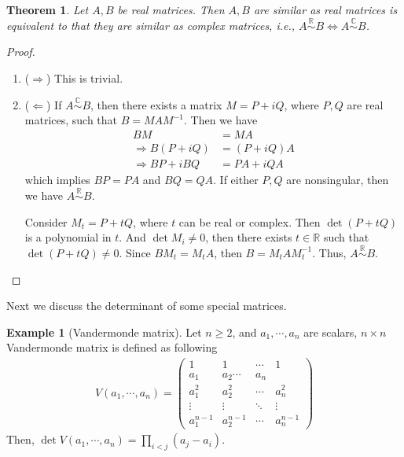\documentclass[11pt]{book}
\newtheorem{theorem}{Theorem}[section]
\theoremstyle{definition}
\newtheorem{example}{Example}[section]
\numberwithin{equation}{chapter}
\begin{document}
\medskip

\begin{theorem}
Let $A,B$ be real matrices. Then $A,B$ are similar as real matrices is equivalent to that they are similar as complex matrices, i.e., $A \overset{\mathbb{R}}{\sim} B\iff A \overset{\mathbb{C}}{\sim} B$.
\end{theorem}
\begin{proof}
~\begin{enumerate}[label=(\arabic*)]
    \item ($\Rightarrow$) This is trivial.
    \item ($\Leftarrow$) If $A \overset{\mathbb{C}}{\sim} B$, then there exists a matrix $M = P + iQ$, where $P,Q$ are real matrices, such that $B = MAM^{-1}$. Then we have
    \begin{align*}
        BM & = MA \\
        \Rightarrow B(P + iQ) & = (P + iQ)A \\
        \Rightarrow BP + i BQ & = PA + i QA
    \end{align*}
    which implies $BP=PA$ and $BQ = QA$. If either $P,Q$ are nonsingular, then we have $A \overset{\mathbb{R}}{\sim} B$.
    
    Consider $M_t = P + tQ$, where $t$ can be real or complex. Then $\det (P+tQ)$ is a polynomial in $t$. And $\det M_i \neq 0$, then there exists $t\in\mathbb{R}$ such that $\det (P+tQ)\neq 0$. Since $BM_t = M_t A$, then $B = M_t A M_t^{-1}$. Thus, $A \overset{\mathbb{R}}{\sim} B$.
\end{enumerate}
\end{proof}

\medskip

Next we discuss the determinant of some special matrices.

\begin{example}[Vandermonde matrix]
Let $n\geq 2$, and $a_1, \cdots, a_n$ are scalars, $n\times n$ Vandermonde matrix is defined as following
\begin{align*}
    V(a_1,\cdots,a_n) = \left(\begin{matrix}
        1 & 1 & \cdots & 1\\
        a_1 & a_2 \cdots & a_n \\
        a_1^2 & a_2^2 & \cdots & a_n^2 \\
        \vdots & \vdots & \ddots & \vdots \\
        a_1^{n-1} & a_2^{n-1} & \cdots & a_n^{n-1}
    \end{matrix}\right)
\end{align*}
Then, $\det V(a_1,\cdots,a_n) = \prod_{i < j}(a_j - a_i)$.
\end{example}
\end{document}
